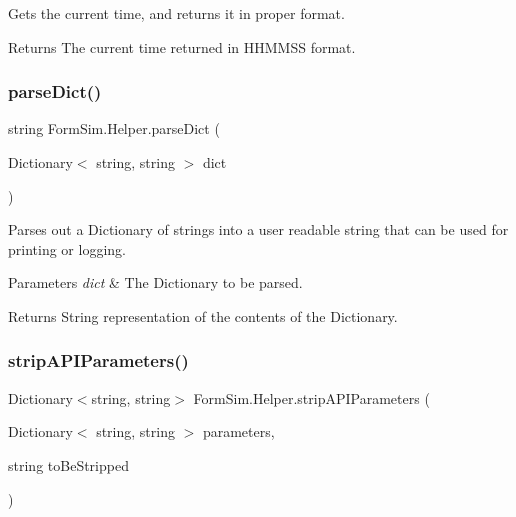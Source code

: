 Gets the current time, and returns it in proper format. 

\begin{DoxyReturn}{Returns}
The current time returned in H\+H\+M\+M\+SS format.
\end{DoxyReturn}
\mbox{\label{class_form_sim_1_1_helper_a1f47101e1905473c2cfb068029be26a4}} 
\subsubsection{\texorpdfstring{parse\+Dict()}{parseDict()}}
{\footnotesize\ttfamily string Form\+Sim.\+Helper.\+parse\+Dict (\begin{DoxyParamCaption}\item[{Dictionary$<$ string, string $>$}]{dict }\end{DoxyParamCaption})\hspace{0.3cm}{\ttfamily [inline]}}



Parses out a Dictionary of strings into a user readable string that can be used for printing or logging. 


\begin{DoxyParams}{Parameters}
{\em dict} & The Dictionary to be parsed.\\
\hline
\end{DoxyParams}
\begin{DoxyReturn}{Returns}
String representation of the contents of the Dictionary.
\end{DoxyReturn}
\mbox{\label{class_form_sim_1_1_helper_a78ee613f626109557d9ee517de730d45}} 
\subsubsection{\texorpdfstring{strip\+A\+P\+I\+Parameters()}{stripAPIParameters()}\hspace{0.1cm}{\footnotesize\ttfamily [1/2]}}
{\footnotesize\ttfamily Dictionary$<$string, string$>$ Form\+Sim.\+Helper.\+strip\+A\+P\+I\+Parameters (\begin{DoxyParamCaption}\item[{Dictionary$<$ string, string $>$}]{parameters,  }\item[{string}]{to\+Be\+Stripped }\end{DoxyParamCaption})\hspace{0.3cm}{\ttfamily [inline]}}



